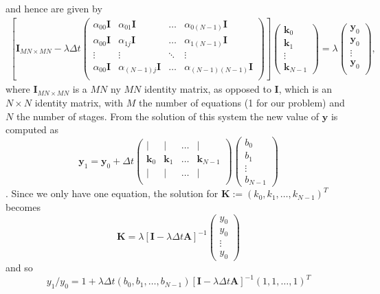 \documentclass[10pt,a4paper]{article}
\newcommand{\bvec}[1]{\mathbf{#1}}
\begin{document}
and hence are given by
\begin{align*}
  \left[ \bvec{I}_{MN\times MN} - \lambda \Delta t \begin{pmatrix}
    \alpha_{00}\bvec{I} &\alpha_{01}\bvec{I} &\hdots &\alpha_{0(N-1)}\bvec{I} \\
    \alpha_{00}\bvec{I} &\alpha_{1j}\bvec{I} &\hdots &\alpha_{1(N-1)}\bvec{I} \\
    \vdots & \vdots & \ddots & \vdots \\
    \alpha_{00}\bvec{I} &\alpha_{(N-1)j}\bvec{I} &\hdots &\alpha_{(N-1)(N-1)}\bvec{I} \\
  \end{pmatrix}\right] \begin{pmatrix} \bvec{k}_0 \\
    \bvec{k}_1 \\
    \vdots \\
    \bvec{k}_{N-1} 
  \end{pmatrix} = \lambda
  \begin{pmatrix}
    \bvec{y}_0 \\
    \bvec{y}_0 \\
    \vdots \\
    \bvec{y}_0 \\
  \end{pmatrix},
\end{align*}
where $\bvec{I}_{MN\times MN}$ is a $MN$ ny $MN$ identity matrix, as opposed to $\bvec{I}$, which is an $N\times N$ identity matrix, with $M$ the number of equations (1 for our problem) and $N$ the number of stages.
From the solution of this system the new value of $\bvec{y}$ is computed as
\begin{equation*}
  \bvec{y}_1 = \bvec{y}_0 + \Delta t
  \begin{pmatrix}
    \vert & \vert & \hdots & \vert \\
    \bvec{k}_0 & \bvec{k}_1 & \hdots & \bvec{k}_{N-1}\\
        \vert & \vert & \hdots & \vert \\
  \end{pmatrix}\begin{pmatrix}
    b_0 \\
    b_1 \\
    \vdots \\
    b_{N-1}
  \end{pmatrix}
\end{equation*}.
Since we only have one equation, the solution for $\bvec{K} := \left(k_0, k_1, \hdots, k_{N-1}\right)^T$ becomes
\begin{equation*}
  \bvec{K} = \lambda \left[ \bvec{I} - \lambda \Delta t \bvec{A}  \right]^{-1}
  \begin{pmatrix}
    y_0 \\
    y_0 \\
    \vdots \\
    y_0
  \end{pmatrix}
\end{equation*}
and so
\begin{equation*}
  y_1/y_0 = 1 + \lambda \Delta t \left(b_0, b_1, \hdots, b_{N-1}\right)\left[\bvec{I} - \lambda \Delta t \bvec{A}\right]^{-1}\left(1, 1, \hdots, 1\right)^T
\end{equation*}
\end{document}
